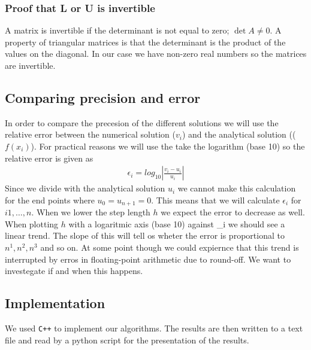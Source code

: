 \documentclass[american,a4paper,12pt]{article}
\begin{document}
\subsubsection*{Proof that L or U is invertible}
A matrix is invertible if the determinant is not equal to zero; $\det A \neq 0$. A property of triangular matrices is that the determinant is the product of the values on the diagonal. In our case we have non-zero real numbers so the matrices are invertible.

\subsection{Comparing precision and error}
In order to compare the precesion of the different solutions we will use the relative error between the numerical solution ($v_i$) and the analytical solution (($f(x_i)$). For practical reasons we will use the take the logarithm (base 10) so the relative error is given as
\begin{align*}
  \epsilon_i = log_{10}\left|\frac{v_i - u_i}{u_i}\right|
\end{align*}
Since we divide with the analytical solution $u_i$ we cannot make this calculation for the end points where $u_0 = u_{n+1} = 0$. This means that we will calculate $\epsilon_i$ for $i 1, \hdots, n$. When we lower the step length $h$ we expect the error to decrease as well. When plotting $h$ with a logaritmic axis (base 10) against \epsilon_i we should see a linear trend. The slope of this will tell os wheter the error is proportional to $n^1, n^2, n^3$ and so on. At some point though we could expiernce that this trend is interrupted by erros in floating-point arithmetic due to round-off. We want to investegate if and when this happens.
\subsection{Implementation}
We used \verb!C++! to implement our algorithms. The results are then written to a text file and read by a python script for the presentation of the results.
\end{document}
